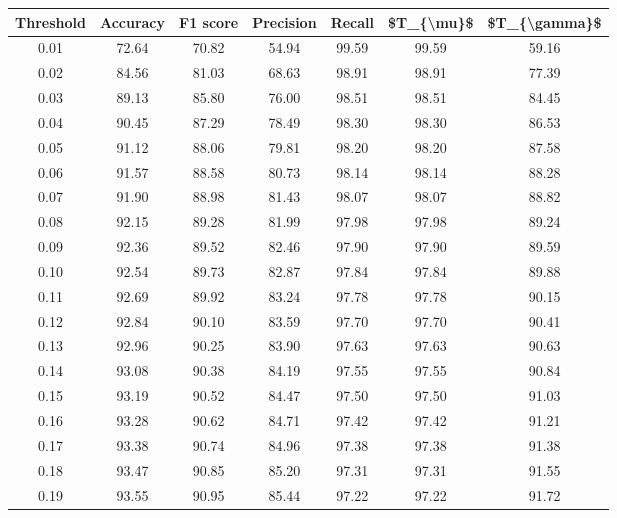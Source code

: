 \begin{tabular}{|c|c|c|c|c|c|c|}
\toprule
 Threshold &  Accuracy &  F1 score &  Precision &  Recall &  \$T\_\{\textbackslash mu\}\$ &  \$T\_\{\textbackslash gamma\}\$ \\
\hline
      0.01 &     72.64 &     70.82 &      54.94 &   99.59 &      99.59 &         59.16 \\
      0.02 &     84.56 &     81.03 &      68.63 &   98.91 &      98.91 &         77.39 \\
      0.03 &     89.13 &     85.80 &      76.00 &   98.51 &      98.51 &         84.45 \\
      0.04 &     90.45 &     87.29 &      78.49 &   98.30 &      98.30 &         86.53 \\
      0.05 &     91.12 &     88.06 &      79.81 &   98.20 &      98.20 &         87.58 \\
      0.06 &     91.57 &     88.58 &      80.73 &   98.14 &      98.14 &         88.28 \\
      0.07 &     91.90 &     88.98 &      81.43 &   98.07 &      98.07 &         88.82 \\
      0.08 &     92.15 &     89.28 &      81.99 &   97.98 &      97.98 &         89.24 \\
      0.09 &     92.36 &     89.52 &      82.46 &   97.90 &      97.90 &         89.59 \\
      0.10 &     92.54 &     89.73 &      82.87 &   97.84 &      97.84 &         89.88 \\
      0.11 &     92.69 &     89.92 &      83.24 &   97.78 &      97.78 &         90.15 \\
      0.12 &     92.84 &     90.10 &      83.59 &   97.70 &      97.70 &         90.41 \\
      0.13 &     92.96 &     90.25 &      83.90 &   97.63 &      97.63 &         90.63 \\
      0.14 &     93.08 &     90.38 &      84.19 &   97.55 &      97.55 &         90.84 \\
      0.15 &     93.19 &     90.52 &      84.47 &   97.50 &      97.50 &         91.03 \\
      0.16 &     93.28 &     90.62 &      84.71 &   97.42 &      97.42 &         91.21 \\
      0.17 &     93.38 &     90.74 &      84.96 &   97.38 &      97.38 &         91.38 \\
      0.18 &     93.47 &     90.85 &      85.20 &   97.31 &      97.31 &         91.55 \\
      0.19 &     93.55 &     90.95 &      85.44 &   97.22 &      97.22 &         91.72 \\

\end{tabular}
